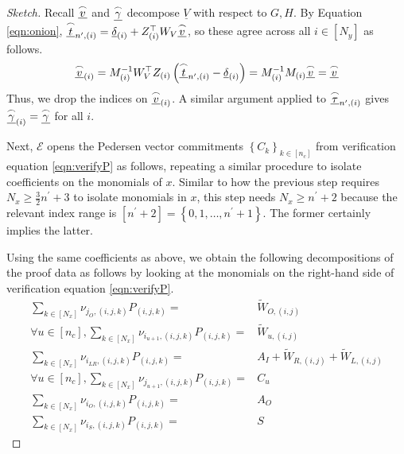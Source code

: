 \documentclass{article}
\theoremstyle{definition}
\begin{document}
\begin{proof}[Sketch]
Recall $\underline{\overset{\LARGE \frown}{\small{v}}}$ and $\underline{\overset{\LARGE \frown}{\small{\gamma}}}$ decompose $\underline{V}$ with respect to $G, H$. By Equation \ref{eqn:onion}, $\underline{\overset{\LARGE \frown}{\small{t}}}_{n^\prime, (i)} = \underline{\delta}_{(i)} + Z^\top_{(i)}W_V \underline{\overset{\LARGE \frown}{\small{v}}}$, so these agree across all $i \in [N_y]$ as follows.
$$\underline{\overset{\LARGE \frown}{\small{v}}}_{(i)} = M^{-1}_{(i)} W^\top_V Z_{(i)}\left(\underline{\overset{\LARGE \frown}{\small{t}}}_{n^\prime,(i)} - \underline{\delta}_{(i)}\right) = M_{(i)}^{-1}M_{(i)}\underline{\overset{\LARGE \frown}{\small{v}}} = \underline{\overset{\LARGE \frown}{\small{v}}}$$
Thus, we drop the indices on $\underline{\overset{\LARGE \frown}{\small{v}}}_{(i)}$. A similar argument applied to $\underline{\overset{\LARGE \frown}{\small{\tau}}}_{n^\prime, (i)}$ gives $\underline{\overset{\LARGE \frown}{\small{\gamma}}}_{(i)} = \underline{\overset{\LARGE \frown}{\small{\gamma}}}$ for all $i$.

Next, $\mathcal{E}$ opens the Pedersen vector commitments $\left\{C_k\right\}_{k \in [n_c]}$ from verification equation \ref{eqn:verifyP} as follows, repeating a similar procedure to isolate coefficients on the monomials of $x$. 
Similar to how the previous step requires $N_x \geq \frac{3}{2}n^\prime + 3$ to isolate monomials in $x$, this step needs $N_x \geq n^\prime + 2$ because the relevant index range is $[n^\prime+2] = \left\{0,1,\ldots,n^\prime+1\right\}$.
The former certainly implies the latter.

Using the same coefficients as above, we obtain the following decompositions of the proof data as follows by looking at the monomials on the right-hand side of verification equation \ref{eqn:verifyP}.
\begin{align*}
\sum_{k\in [N_x]} \nu_{j_O,(i,j,k)}P_{(i,j,k)} =&  \widetilde{W}_{O, (i,j)} \\ 
\forall u \in [n_c], \sum_{k\in [N_x]} \nu_{i_{u+1},(i,j,k)}P_{(i,j,k)} =& \widetilde{W}_{u, (i,j)}  \\
\sum_{k\in [N_x]} \nu_{i_{LR},(i,j,k)}P_{(i,j,k)} =&  A_I + \widetilde{W}_{R,(i,j)} + \widetilde{W}_{L,(i,j)} \\ 
\forall u \in [n_c], \sum_{k \in [N_x]} \nu_{j_{u+1},(i,j,k)}P_{(i,j,k)} =& C_u \\ 
\sum_{k\in [N_x]} \nu_{i_O,(i,j,k)}P_{(i,j,k)} =&  A_O \\
\sum_{k\in [N_x]} \nu_{i_S,(i,j,k)}P_{(i,j,k)} =&  S  
\end{align*}
  

\end{proof}
\end{document}
